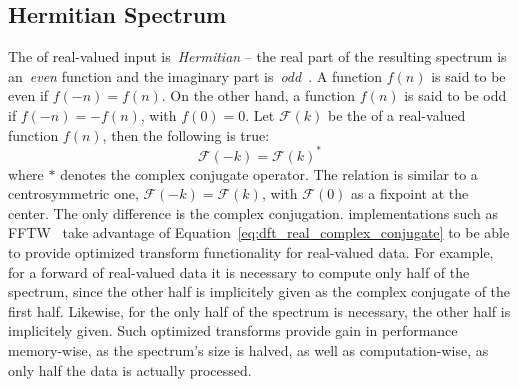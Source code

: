 \subsection{Hermitian Spectrum}
The \FourierTransform of real-valued input is~\emph{Hermitian} -- the real part of the resulting spectrum
is an~\emph{even} function and the imaginary part is~\emph{odd}~\citep{book:bracewell2000fourier}.
A function $f(n)$ is said to be even if
$f(-n) = f(n)$. On the other hand, a function $f(n)$ is said to be odd if $f(-n) = -f(n)$,
with $f(0) = 0$. Let $\mathcal{F}(k)$ be the \FourierTransform of a real-valued function $f(n)$, then
the following is true:
\begin{equation}
\label{eq:dft_real_complex_conjugate}
 \mathcal{F}(-k) = \mathcal{F}(k)^*
\end{equation}
where $*$ denotes the complex conjugate operator. The relation is similar to a centrosymmetric one,
$\mathcal{F}(-k) = \mathcal{F}(k)$, with $\mathcal{F}(0)$ as a fixpoint at the center. The only
difference is the complex conjugation. \FourierTransform implementations such as FFTW~\citep{FFTW05}
take advantage of Equation~\ref{eq:dft_real_complex_conjugate} to be able to provide optimized
transform functionality for real-valued data. For example, for a forward \FourierTransform of real-valued data it is
necessary to compute only half of the spectrum, since the other half is implicitely given as the
complex conjugate of the first half. Likewise, for the \InvFourierTransform only half of the
spectrum is necessary, the other half is implicitely given. Such optimized transforms provide
gain in performance memory-wise, as the spectrum's size is halved, as well as computation-wise, as only
half the data is actually processed.
%
